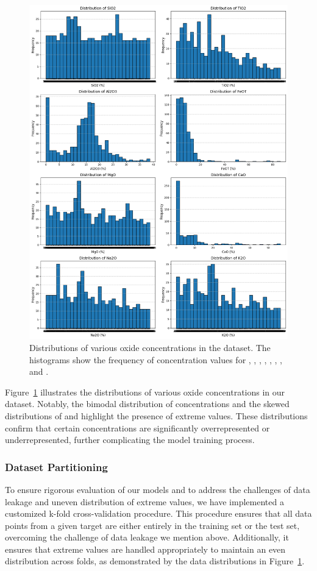 \begin{figure}[h!]
    \centering
    \includegraphics[width=\textwidth]{images/oxide_distributions.png}
    \caption{Distributions of various oxide concentrations in the dataset. The histograms show the frequency of concentration values for , , , , , , , and .}
    \label{fig:oxide_distributions}
\end{figure}

Figure~\ref{fig:oxide_distributions} illustrates the distributions of various oxide concentrations in our dataset.
Notably, the bimodal distribution of  concentrations and the skewed distributions of  and  highlight the presence of extreme values.
These distributions confirm that certain concentrations are significantly overrepresented or underrepresented, further complicating the model training process.


\subsubsection{Dataset Partitioning}\label{subsubsec:dataset_partitioning}
To ensure rigorous evaluation of our models and to address the challenges of data leakage and uneven distribution of extreme values, we have implemented a customized k-fold cross-validation procedure.
This procedure ensures that all data points from a given target are either entirely in the training set or the test set, overcoming the challenge of data leakage we mention above.
Additionally, it ensures that extreme values are handled appropriately to maintain an even distribution across folds, as demonstrated by the data distributions in Figure~\ref{fig:oxide_distributions}.

